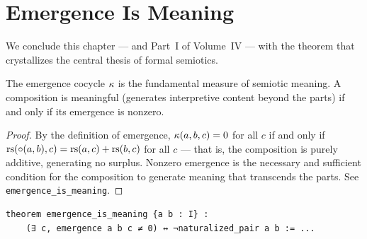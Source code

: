 \section{Emergence Is Meaning}

We conclude this chapter --- and Part~I of Volume~IV --- with the
theorem that crystallizes the central thesis of formal semiotics.

\begin{theorem}
\label{thm:emergence-is-meaning}
The emergence cocycle $\kappa$ is the fundamental measure of semiotic
meaning. A composition is meaningful (generates interpretive content
beyond the parts) if and only if its emergence is nonzero.
\end{theorem}

\begin{proof}
By the definition of emergence, $\kappa(a, b, c) = 0$ for all $c$ if
and only if $\mathrm{rs}(\circ(a,b), c) = \mathrm{rs}(a, c) + \mathrm{rs}(b, c)$ for all
$c$ --- that is, the composition is purely additive, generating no
surplus. Nonzero emergence is the necessary and sufficient condition
for the composition to generate meaning that transcends the parts.
See \texttt{emergence\_is\_meaning}.
\end{proof}

\begin{lstlisting}[caption={The fundamental theorem of formal semiotics}]
theorem emergence_is_meaning {a b : I} :
    (∃ c, emergence a b c ≠ 0) ↔ ¬naturalized_pair a b := ...
\end{lstlisting}

